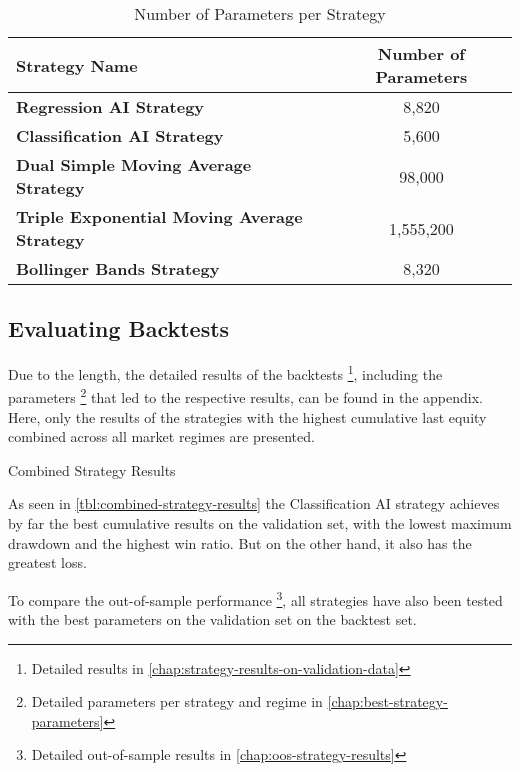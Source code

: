 \begin{table}[H]
    \centering
    \begin{tabular}{L{8cm}c}
        \toprule
        Strategy Name & Number of Parameters
        \\
        \midrule
        \textbf{Regression AI Strategy}                     & 8,820     \\
        \textbf{Classification AI Strategy}                 & 5,600     \\
        \textbf{Dual Simple Moving Average Strategy}        & 98,000    \\
        \textbf{Triple Exponential Moving Average Strategy} & 1,555,200 \\
        \textbf{Bollinger Bands Strategy}                   & 8,320     \\
        \bottomrule
    \end{tabular}
    \caption{Number of Parameters per Strategy}
    \label{tbl:parameters-number}
\end{table}

\subsection{Evaluating Backtests}

Due to the length, the detailed results of the backtests \footnote{Detailed results in \autoref{chap:strategy-results-on-validation-data}}, including the parameters \footnote{Detailed parameters per strategy and regime in \autoref{chap:best-strategy-parameters}} that led to the respective results, can be found in the appendix.
Here, only the results of the strategies with the highest cumulative last equity combined across all market regimes are presented.

\begin{table}[H]
    
    \caption{Combined Strategy Results}
    \label{tbl:combined-strategy-results}
\end{table}

\noindent
As seen in \autoref{tbl:combined-strategy-results} the Classification AI strategy achieves by far the best cumulative results on the validation set, with the lowest maximum drawdown and the highest win ratio.
But on the other hand, it also has the greatest loss.

To compare the out-of-sample performance \footnote{Detailed out-of-sample results in \autoref{chap:oos-strategy-results}}, all strategies have also been tested with the best parameters on the validation set on the backtest set.

